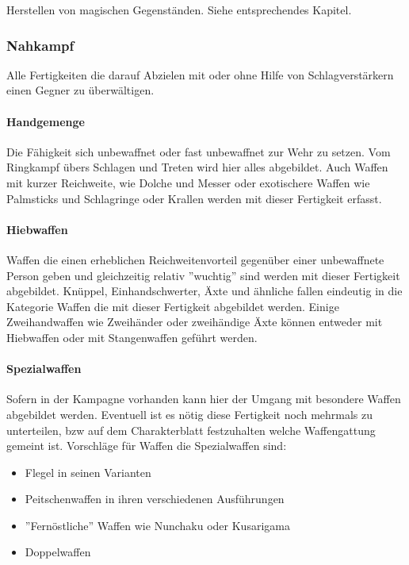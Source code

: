 \documentclass{article}
\begin{document}
Herstellen von magischen Gegenständen. Siehe entsprechendes Kapitel.

\subsubsection{Nahkampf}

Alle Fertigkeiten die darauf Abzielen mit oder ohne Hilfe von Schlagverstärkern einen Gegner zu überwältigen.

\paragraph{Handgemenge}
Die Fähigkeit sich unbewaffnet oder fast unbewaffnet zur Wehr zu setzen. Vom Ringkampf übers Schlagen und Treten
wird hier alles abgebildet. Auch Waffen mit kurzer Reichweite, wie Dolche und Messer oder exotischere Waffen wie
Palmsticks und Schlagringe oder Krallen werden mit dieser Fertigkeit erfasst.

\paragraph{Hiebwaffen}

Waffen die einen erheblichen Reichweitenvorteil gegenüber einer unbewaffnete Person geben und gleichzeitig relativ
''wuchtig'' sind werden mit dieser Fertigkeit abgebildet. Knüppel, Einhandschwerter, Äxte und ähnliche fallen
eindeutig in die Kategorie Waffen die mit dieser Fertigkeit abgebildet werden. Einige Zweihandwaffen wie
Zweihänder oder zweihändige Äxte können entweder mit Hiebwaffen oder mit Stangenwaffen geführt werden.

\paragraph{Spezialwaffen}

Sofern in der Kampagne vorhanden kann hier der Umgang mit besondere Waffen abgebildet werden. Eventuell ist es nötig
diese Fertigkeit noch mehrmals zu unterteilen, bzw auf dem Charakterblatt festzuhalten welche Waffengattung gemeint
ist. Vorschläge für Waffen die Spezialwaffen sind:
\begin{itemize}
\item Flegel in seinen Varianten
\item Peitschenwaffen in ihren verschiedenen Ausführungen
\item ''Fernöstliche'' Waffen wie Nunchaku oder Kusarigama
\item Doppelwaffen
\end{itemize}
\end{document}
